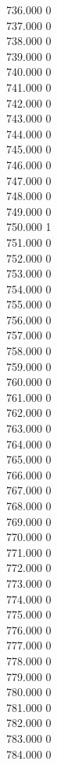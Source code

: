 { 736.000	0 \\
 737.000	0 \\
 738.000	0 \\
 739.000	0 \\
 740.000	0 \\
 741.000	0 \\
 742.000	0 \\
 743.000	0 \\
 744.000	0 \\
 745.000	0 \\
 746.000	0 \\
 747.000	0 \\
 748.000	0 \\
 749.000	0 \\
 750.000	1 \\
 751.000	0 \\
 752.000	0 \\
 753.000	0 \\
 754.000	0 \\
 755.000	0 \\
 756.000	0 \\
 757.000	0 \\
 758.000	0 \\
 759.000	0 \\
 760.000	0 \\
 761.000	0 \\
 762.000	0 \\
 763.000	0 \\
 764.000	0 \\
 765.000	0 \\
 766.000	0 \\
 767.000	0 \\
 768.000	0 \\
 769.000	0 \\
 770.000	0 \\
 771.000	0 \\
 772.000	0 \\
 773.000	0 \\
 774.000	0 \\
 775.000	0 \\
 776.000	0 \\
 777.000	0 \\
 778.000	0 \\
 779.000	0 \\
 780.000	0 \\
 781.000	0 \\
 782.000	0 \\
 783.000	0 \\
 784.000	0 \\
}
